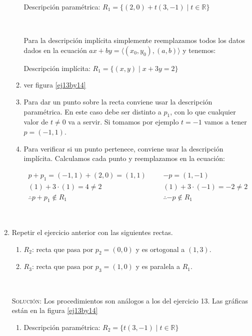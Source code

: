 \documentclass[a4paper,12pt,twoside,spanish,reqno]{amsbook}
\numberwithin{equation}{section}
\newcommand{\rta}{\noindent\textsc{Solución: }}
\begin{document}
\begin{enumerate}[resume]
\begin{enumerate}
Descripción paramétrica: $\boxed {R_1 = \{ (2,0) + t(3,-1) \; | \; t \in \mathbb{R} \} }$

\

Para la descripción implícita simplemente reemplazamos todos los datos dados en la ecuación $ax + by = \langle (x_0,y_0) , (a,b) \rangle $ y tenemos:

Descripción implícita: $\boxed {R_1 = \{ (x,y) \; | \; x+3y = 2 \} }$

\item ver figura \ref{ej13by14}

\setcounter{enumii}{2}
 \item Para dar un punto sobre la recta conviene usar la descripción paramétrica. En este caso debe ser distinto a $p_1$, con lo que cualquier valor de $t \neq 0$ va a servir. Si tomamos por ejemplo $t=-1$ vamos a tener $\boxed {p = (-1,1) }$.
 \item Para verificar si un punto pertenece, conviene usar la descripción implícita. Calculamos cada punto y reemplazamos en la ecuación:

\begin{equation*}
\begin{array}{ll|ll}
p+p_1 = (-1,1) + (2,0) = (1,1) &&& -p = (1,-1) \\
(1) + 3 \cdot (1) = 4 \neq 2	&&& (1) + 3 \cdot (-1) = -2 \neq 2 \\
\therefore  p+p_1 \notin R_1   &&& \therefore  -p \notin R_1
\end{array}
\end{equation*}

\end{enumerate}

\

\item Repetir el ejercicio anterior con las siguientes rectas.
\begin{enumerate}
	\item
	$R_2$: recta que pasa por $p_2=(0,0)$ y es ortogonal a $(1,3)$.
	\item
	$R_3$: recta que pasa por $p_3=(1,0)$ y es paralela a $R_1$.
\end{enumerate}

\

\rta Los procedimientos son análogos a los del ejercicio 13. Las gráficas están en la figura \ref{ej13by14}

\begin{enumerate}
	\item 
Descripción paramétrica: $\boxed {R_2 = \{ t(3,-1) \; | \; t \in \mathbb{R} \} }$


\end{enumerate}
\end{enumerate}
\end{document}
